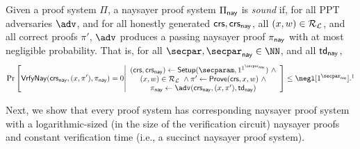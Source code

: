 \begin{definition} Given a proof system $\Pi$, a naysayer proof system $\Pi_{\mathsf{nay}}$ is \emph{sound} if, for all PPT adversaries $\adv$, and for all honestly generated $\mathsf{crs}, \mathsf{crs}_{\mathsf{nay}}$, all $(x,w) \in \mathcal{R}_{\mathcal{L}}$, and all correct proofs $\pi'$, $\adv$ produces a passing naysayer proof $\pi_{\mathsf{nay}}$ with at most negligible probability. That is, for all $\secpar, \naysecpar \in \NN$, and all $\mathsf{td}_{\mathsf{nay}}$,
\begin{equation*}
    \Pr\left[
        \vrfynay(\crs_{\nay}, (x,\pi'), \pi_{\nay})=0 
        \middle| 
        \begin{array}{c}
            (\crs, \crs_\nay) \gets \setup(\secparam, 1^{\naysecparam})~\land\\
            (x,w) \in \Rel_\Lang~\land
            \pi' \gets \prove(\crs, x, w)~\land\\
            \pi_\nay \gets \adv(\crs_\nay, (x, \pi'), \td_\nay)
        \end{array}
    \right] \leq\negl[\naysecparam].\footnotemark
\end{equation*}
\end{definition}

Next, we show that every proof system has corresponding naysayer proof system with a logarithmic-sized (in the size of the verification circuit) naysayer proofs and constant verification time (i.e., a succinct naysayer proof system). %

